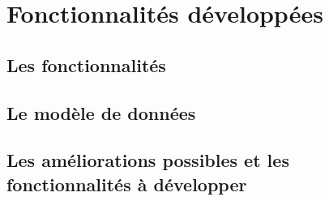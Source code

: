 \newpage


\section{Fonctionnalités développées}

\subsection{Les fonctionnalités}
\subsection{Le modèle de données}
\subsection{Les améliorations possibles et les fonctionnalités à développer}